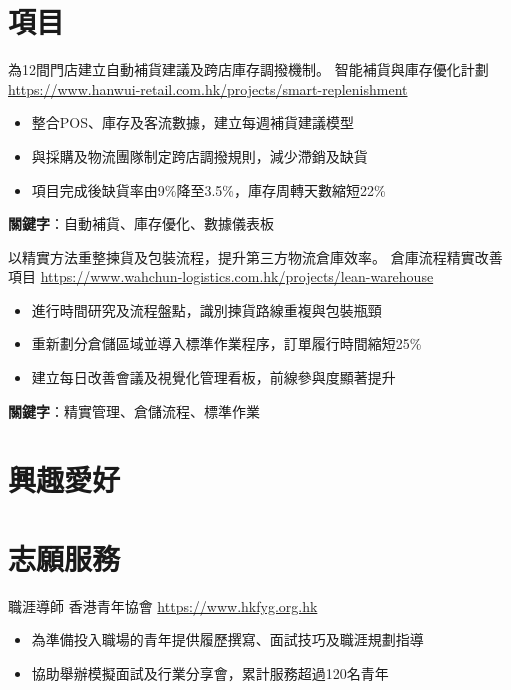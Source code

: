 \documentclass[a4paper, serif, 10pt]{moderncv}
\begin{document}
\section{項目}

        {為12間門店建立自動補貨建議及跨店庫存調撥機制。}
        {智能補貨與庫存優化計劃}
        {\url{https://www.hanwui-retail.com.hk/projects/smart-replenishment}}
        {}
        {\begin{itemize}
\item 整合POS、庫存及客流數據，建立每週補貨建議模型
\item 與採購及物流團隊制定跨店調撥規則，減少滯銷及缺貨
\item 項目完成後缺貨率由9\%降至3.5\%，庫存周轉天數縮短22\%
\end{itemize}
\textbf{關鍵字}：自動補貨、庫存優化、數據儀表板}

        {以精實方法重整揀貨及包裝流程，提升第三方物流倉庫效率。}
        {倉庫流程精實改善項目}
        {\url{https://www.wahchun-logistics.com.hk/projects/lean-warehouse}}
        {}
        {\begin{itemize}
\item 進行時間研究及流程盤點，識別揀貨路線重複與包裝瓶頸
\item 重新劃分倉儲區域並導入標準作業程序，訂單履行時間縮短25\%
\item 建立每日改善會議及視覺化管理看板，前線參與度顯著提升
\end{itemize}
\textbf{關鍵字}：精實管理、倉儲流程、標準作業}
\section{興趣愛好}

\section{志願服務}

        {職涯導師}
        {香港青年協會}
        {\url{https://www.hkfyg.org.hk}}
        {}
        {\begin{itemize}
\item 為準備投入職場的青年提供履歷撰寫、面試技巧及職涯規劃指導
\item 協助舉辦模擬面試及行業分享會，累計服務超過120名青年
\end{itemize}}
    
\end{document}
